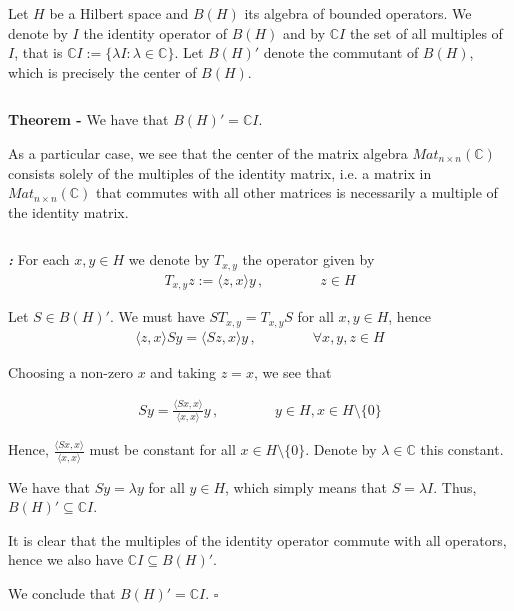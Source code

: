 \documentclass[12pt]{article}
\begin{document}
Let $H$ be a Hilbert space and $B(H)$ its algebra of bounded operators. We denote by $I$ the identity operator of $B(H)$ and by $\mathbb{C}I$ the set of all multiples of $I$, that is $\mathbb{C}I := \{ \lambda I : \lambda \in \mathbb{C}\}$. Let $B(H)'$ denote the commutant of $B(H)$, which is precisely the center of $B(H)$.

$\,$

{\bf Theorem -} We have that $B(H)' = \mathbb{C}I$.

As a particular case, we see that the center of the matrix algebra $Mat_{n \times n} (\mathbb{C})$ consists solely of the multiples of the identity matrix, i.e. a matrix in $Mat_{n \times n} (\mathbb{C})$ that commutes with all other matrices is necessarily a multiple of the identity matrix.

$\,$

{\bf \emph{:}} For each $x, y \in H$ we denote by $T_{x,y}$ the operator given by
\begin{align*}
T_{x,y} z:= \langle z, x \rangle y\,, \qquad\qquad z \in H
\end{align*}

Let $S \in B(H)'$. We must have $ST_{x,y} = T_{x,y}S$ for all $x,y \in H$, hence
\begin{align}
\langle z, x \rangle Sy = \langle Sz,x \rangle y\,, \qquad\qquad \forall x,y,z \in H
\end{align}

Choosing a non-zero $x$ and taking $z = x$, we see that

\begin{align*}
Sy = \frac{\langle Sx, x \rangle}{\langle x, x \rangle} y\,, \qquad\qquad y \in H, x \in H \setminus \{0\}
\end{align*}

Hence, $\displaystyle \frac{\langle Sx, x \rangle}{\langle x, x \rangle}$ must be constant for all $x \in H \setminus \{0\}$. Denote by $\lambda \in \mathbb{C}$ this constant.

We have that $Sy = \lambda y$ for all $y \in H$, which simply means that $S = \lambda I$. Thus, $B(H)' \subseteq \mathbb{C} I$.

It is clear that the multiples of the identity operator commute with all operators, hence we also have $\mathbb{C} I \subseteq B(H)'$.

We conclude that $B(H)' = \mathbb{C} I$. $\square$
\end{document}
